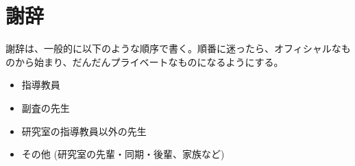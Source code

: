 \chapter*{謝辞}
\label{chap:ackn}

謝辞は、一般的に以下のような順序で書く。順番に迷ったら、オフィシャルなものから始まり、だんだんプライベートなものになるようにする。

\begin{itemize}
  \item 指導教員
  \item 副査の先生
  \item 研究室の指導教員以外の先生
  \item その他 (研究室の先輩・同期・後輩、家族など)
\end{itemize}
